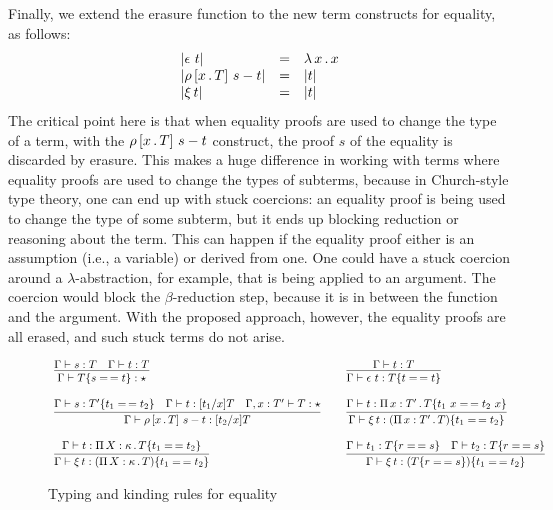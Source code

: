 \documentclass{article}
\begin{document}
Finally, we extend the erasure function to the new term constructs
for equality, as follows:
\[
\begin{array}{lll}
  |\epsilon\ t| & = & \lambda\, x\, .\, x \\
  |\rho\, [x\,.\,T]\ s - t| & = & |t| \\
  |\xi\, t| & = & |t|
\end{array}
\]
\noindent The critical point here is that when equality proofs are
used to change the type of a term, with the $\rho\, [x\,.\,T]\ s - t$
construct, the proof $s$ of the equality is discarded by erasure.
This makes a huge difference in working with terms where equality
proofs are used to change the types of subterms, because in
Church-style type theory, one can end up with stuck coercions: an
equality proof is being used to change the type of some subterm, but
it ends up blocking reduction or reasoning about the term.  This can
happen if the equality proof either is an assumption (i.e., a
variable) or derived from one.  One could have a stuck coercion around
a $\lambda$-abstraction, for example, that is being applied to an
argument.  The coercion would block the $\beta$-reduction step,
because it is in between the function and the argument.  With the
proposed approach, however, the equality proofs are all erased, and
such stuck terms do not arise.


\begin{figure}
  \[
  \begin{array}{lll}
    \infer{\Gamma\vdash\eqtm{s}{T}{t} : \star}{\Gamma\vdash s : T & \Gamma\vdash t : T}
    &\ &
\infer{\Gamma\vdash\rfl{t} : \eqtm{t}{T}{t}}{\Gamma\vdash t : T}
\\\\    
\infer{\Gamma\vdash\cng{x}{T}{s}{t} : [t_2/x]T}
          {\Gamma\vdash s : \eqtm{t_1}{T'}{t_2} & \Gamma \vdash t : [t_1/x]T & \Gamma,x:T'\vdash T : \star}
    &\ &
    \infer{\Gamma\vdash\ext{t} : \eqtm{t_1}{(\Pia{x}{T'}{T})}{t_2}}{\Gamma \vdash t : \Pia{x}{T'}{\eqtm{t_1\ x}{T}{t_2\ x}}}
\\ \\
\infer{\Gamma\vdash\ext{t} : \eqtm{t_1}{(\Pia{X}{\kappa}{T})}{t_2}}{\Gamma \vdash t : \Pia{X}{\kappa}{\eqtm{t_1}{T}{t_2}}}
&\ &
\infer{\Gamma\vdash\ext{t} : \eqtm{t_1}{(\eqtm{r}{T}{s})}{t_2}}{\Gamma\vdash t_1 : \eqtm{r}{T}{s} & \Gamma\vdash t_2 : \eqtm{r}{T}{s}}
    \end{array}
  \]
\caption{Typing and kinding rules for equality}
\label{fig:eqtp}
  \end{figure}
  
\end{document}

